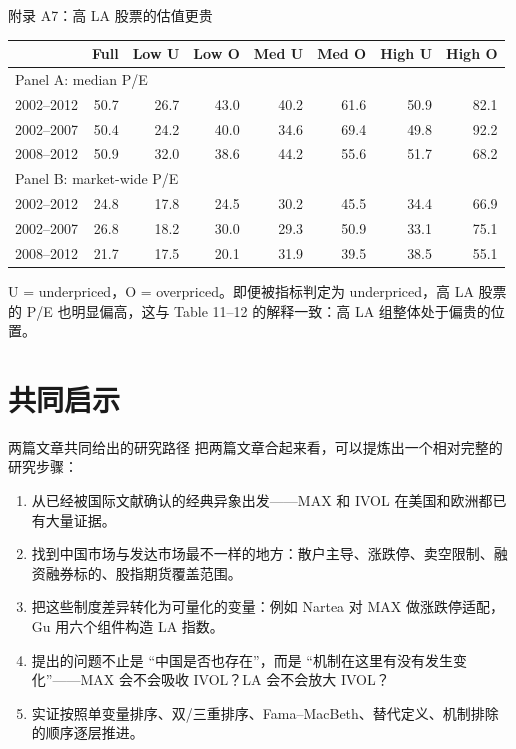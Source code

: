 \documentclass[aspectratio=169,10pt]{beamer}
\newcommand{\tighttable}{\scriptsize\setlength{\tabcolsep}{3pt}\renewcommand{\arraystretch}{1.12}}
\begin{document}
\begin{frame}{附录 A7：高 LA 股票的估值更贵}
	\tighttable
	\begin{tabular}{lrrrrrrr}
		\toprule
		& Full & Low U & Low O & Med U & Med O & High U & High O\\
		\midrule
		\multicolumn{8}{l}{Panel A: median P/E}\\
		2002--2012 & 50.7 & 26.7 & 43.0 & 40.2 & 61.6 & 50.9 & 82.1\\
		2002--2007 & 50.4 & 24.2 & 40.0 & 34.6 & 69.4 & 49.8 & 92.2\\
		2008--2012 & 50.9 & 32.0 & 38.6 & 44.2 & 55.6 & 51.7 & 68.2\\
		\midrule
		\multicolumn{8}{l}{Panel B: market-wide P/E}\\
		2002--2012 & 24.8 & 17.8 & 24.5 & 30.2 & 45.5 & 34.4 & 66.9\\
		2002--2007 & 26.8 & 18.2 & 30.0 & 29.3 & 50.9 & 33.1 & 75.1\\
		2008--2012 & 21.7 & 17.5 & 20.1 & 31.9 & 39.5 & 38.5 & 55.1\\
		\bottomrule
	\end{tabular}
	\par\vspace{5pt}
	\small U = underpriced，O = overpriced。即便被指标判定为 underpriced，高 LA 股票的 P/E 也明显偏高，这与 Table 11--12 的解释一致：高 LA 组整体处于偏贵的位置。
\end{frame}

\section{共同启示}

\begin{frame}{两篇文章共同给出的研究路径}
	把两篇文章合起来看，可以提炼出一个相对完整的研究步骤：
	\begin{enumerate}
		\item 从已经被国际文献确认的经典异象出发——MAX 和 IVOL 在美国和欧洲都已有大量证据。
		\item 找到中国市场与发达市场最不一样的地方：散户主导、涨跌停、卖空限制、融资融券标的、股指期货覆盖范围。
		\item 把这些制度差异转化为可量化的变量：例如 Nartea 对 MAX 做涨跌停适配，Gu 用六个组件构造 LA 指数。
		\item 提出的问题不止是 ``中国是否也存在''，而是 ``机制在这里有没有发生变化''——MAX 会不会吸收 IVOL？LA 会不会放大 IVOL？
		\item 实证按照单变量排序、双/三重排序、Fama--MacBeth、替代定义、机制排除的顺序逐层推进。
	\end{enumerate}
\end{frame}
\end{document}
